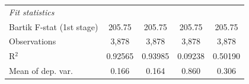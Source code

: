 \begin{tabular}{lcccc}
   \midrule
   \emph{Fit statistics}\\
   Bartik F-stat (1st stage)                                     & 205.75                             & 205.75                           & 205.75                         & 205.75\\  
   Observations                                                          & 3,878                              & 3,878                            & 3,878                          & 3,878\\  
   R$^2$                                                                 & 0.92565                            & 0.93985                          & 0.09238                        & 0.50190\\  
   Mean of dep. var.                                                     & 0.166                              & 0.164                            & 0.860                          & 0.306\\  
\bottomrule
\end{tabular}
